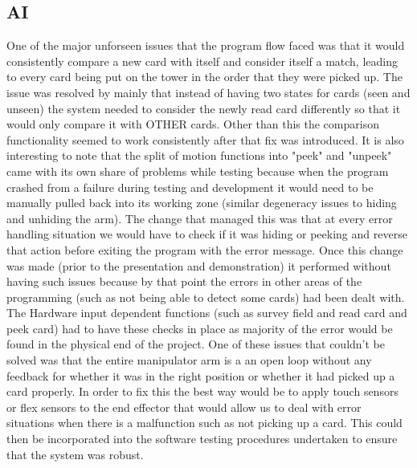 \subsection{AI}
One of the major unforseen issues that the program flow faced was that it would consistently compare a new card with itself and consider itself a match, leading to every card being put on the tower in the order that they were picked up. The issue was resolved by mainly that instead of having two states for cards (seen and unseen) the system needed to consider the newly read card differently so that it would only compare it with OTHER cards. Other than this the comparison functionality seemed to work consistently after that fix was introduced. It is also interesting to note that the split of motion functions into "peek" and "unpeek" came with its own share of problems while testing because when the program crashed from a failure during testing and development it would need to be manually pulled back into its working zone (similar degeneracy issues to hiding and unhiding the arm). The change that managed this was that at every error handling situation we would have to check if it was hiding or peeking and reverse that action before exiting the program with the error message. Once this change was made (prior to the presentation and demonstration) it performed without having such issues because by that point the errors in other areas of the programming (such as not being able to detect some cards) had been dealt with. The Hardware input dependent functions (such as survey field and read card and peek card) had to have these checks in place as majority of the error would be found in the physical end of the project. One of these issues that couldn't be solved was that the entire manipulator arm is a an open loop without any feedback for whether it was in the right position or whether it had picked up a card properly. In order to fix this the best way would be to apply touch sensors or flex sensors to the end effector that would allow us to deal with error situations when there is a malfunction such as not picking up a card. This could then be incorporated into the software testing procedures undertaken to ensure that the system was robust.